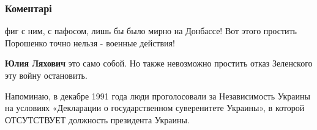  
 
 
 
 
\subsubsection{Коментарі}

\begin{itemize}
\par
 
фиг с ним, с пафосом, лишь бы было мирно на Донбассе! Вот этого простить Порошенко точно нельзя - военные действия!

 
\textbf{Юлия Ляхович} это само собой. Но также невозможно простить отказ Зеленского эту войну остановить.

\par
 

Напоминаю, в декабре 1991 года люди проголосовали за Независимость Украины на
условиях «Декларации о государственном суверенитете Украины», в которой
ОТСУТСТВУЕТ должность президента Украины.
\end{itemize}

